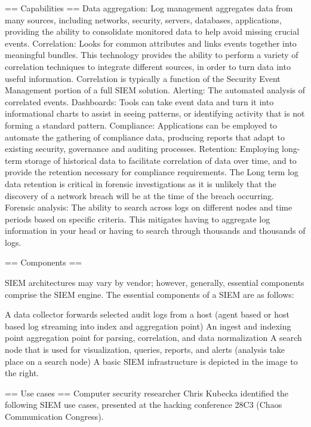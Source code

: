 == Capabilities ==
Data aggregation: Log management aggregates data from many sources, including networks, security, servers, databases, applications, providing the ability to consolidate monitored data to help avoid missing crucial events.
Correlation: Looks for common attributes and links events together into meaningful bundles. This technology provides the ability to perform a variety of correlation techniques to integrate different sources, in order to turn data into useful information. Correlation is typically a function of the Security Event Management portion of a full SIEM solution.
Alerting: The automated analysis of correlated events.
Dashboards: Tools can take event data and turn it into informational charts to assist in seeing patterns, or identifying activity that is not forming a standard pattern.
Compliance: Applications can be employed to automate the gathering of compliance data, producing reports that adapt to existing security, governance and auditing processes.
Retention: Employing long-term storage of historical data to facilitate correlation of data over time, and to provide the retention necessary for compliance requirements. The Long term log data retention is critical in forensic investigations as it is unlikely that the discovery of a network breach will be at the time of the breach occurring.
Forensic analysis: The ability to search across logs on different nodes and time periods based on specific criteria. This mitigates having to aggregate log information in your head or having to search through thousands and thousands of logs.


== Components ==

SIEM architectures may vary by vendor; however, generally, essential components comprise the SIEM engine. The essential components of a SIEM are as follows:

A data collector forwards selected audit logs from a host (agent based or host based log streaming into index and aggregation point) 
An ingest and indexing point aggregation point for parsing, correlation, and data normalization
A search node that is used for visualization, queries, reports, and alerts (analysis take place on a search node) 
A basic SIEM infrastructure is depicted in the image to the right.


== Use cases ==
Computer security researcher Chris Kubecka identified the following SIEM use cases, presented at the hacking conference 28C3 (Chaos Communication Congress).

